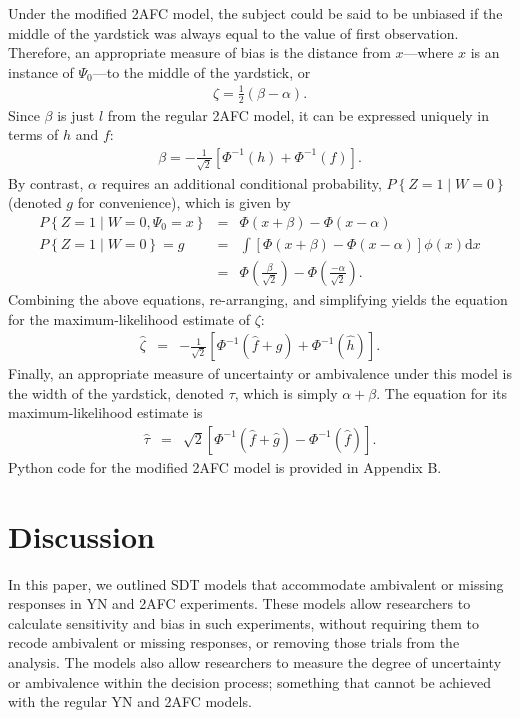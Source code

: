 \documentclass[man]{apa6}
\begin{document}
Under the modified 2AFC model, the subject could be said to be unbiased if the middle of the yardstick was always equal to the value of first observation. Therefore, an appropriate measure of bias is the distance from $x$---where $x$ is an instance of $\Psi_0$---to the middle of the yardstick, or
\begin{eqnarray*}
\zeta=\frac{1}{2}\left(\beta-\alpha\right)\textrm{.}
\end{eqnarray*}
Since $\beta$ is just $l$ from the regular 2AFC model, it can be expressed uniquely in terms of $h$ and $f$:
\begin{eqnarray*}
\beta=-\frac{1}{\sqrt{2}}\left[\Phi^{-1}\left(h\right)+\Phi^{-1}\left(f\right)\right]\textrm{.}
\end{eqnarray*}
By contrast, $\alpha$ requires an additional conditional probability, $P\left\{Z=1\mid{}W=0\right\}$ (denoted $g$ for convenience), which is given by
\begin{eqnarray*}
P\left\{Z=1\mid{}W=0,\Psi_0=x\right\}&=&\Phi\left(x+\beta\right)-\Phi\left(x-\alpha\right)\\
P\left\{Z=1\mid{}W=0\right\}=g&=&\int\!\left[\Phi\left(x+\beta\right)-\Phi\left(x-\alpha\right)\right]\phi\left(x\right)\textrm{d}x\\
&=&\Phi\left(\frac{\beta}{\sqrt{2}}\right)-\Phi\left(\frac{-\alpha}{\sqrt{2}}\right)\textrm{.}
\end{eqnarray*}
Combining the above equations, re-arranging, and simplifying yields the equation for the maximum-likelihood estimate of $\zeta$:
\begin{eqnarray}
\hat{\zeta}&=&-\frac{1}{\sqrt{2}}\left[\Phi^{-1}\left(\hat{f}+\hat{g}\right)+\Phi^{-1}\left(\hat{h}\right)\right]\textrm{.}
\end{eqnarray}
Finally, an appropriate measure of uncertainty or ambivalence under this model is the width of the yardstick, denoted $\tau$, which is simply $\alpha+\beta$. The equation for its maximum-likelihood estimate is
\begin{eqnarray}
\hat{\tau}&=&\sqrt{2}\left[\Phi^{-1}\left(\hat{f}+\hat{g}\right)-\Phi^{-1}\left(\hat{f}\right)\right]\textrm{.}
\end{eqnarray}Python code for the modified 2AFC model is provided in Appendix B.

\section{Discussion}
In this paper, we outlined SDT models that accommodate ambivalent or missing responses in YN and 2AFC experiments. These models allow researchers to calculate sensitivity and bias in such experiments, without requiring them to recode ambivalent or missing responses, or removing those trials from the analysis. The models also allow researchers to measure the degree of uncertainty or ambivalence within the decision process; something that cannot be achieved with the regular YN and 2AFC models.
\end{document}
